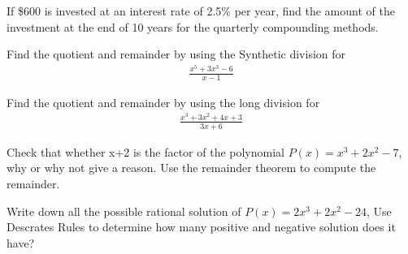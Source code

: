 \documentclass[11pt]{exam}
\begin{document}
\begin{questions}

\vspace{8cm}
\addpoints
\question[10] If \$600 is invested at an interest rate of 2.5\% per year, find the amount of the investment at the end of 10 years for the quarterly compounding methods.

\vspace{8cm}
\addpoints
\question[10] Find the quotient and remainder by using the Synthetic division for 
\begin{align*}
\frac{x^5+3x^3-6}{x-1}
\end{align*}

\vspace{10cm}
\addpoints
\question[10] Find the quotient and remainder by using the long division for 
\begin{align*}
\frac{x^3+3x^2+4x+3}{3x+6}
\end{align*}


\vspace{8cm}
\addpoints
\question[10] Check that whether x+2 is the factor of the polynomial $P(x)=x^3+2x^2-7$, why or why not give a reason. Use the remainder theorem to compute the remainder. 


\vspace{8cm}
\noaddpoints
\question[5 Bonus] Write down all the possible rational solution of $P(x)=2x^3+2x^2-24$, Use Descrates Rules to determine how many positive and negative solution does it have?
 


\end{questions}
\end{document}
